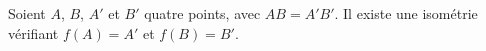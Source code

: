 Soient $A$, $B$, $A'$ et $B'$  quatre points, avec $AB=A'B'$. Il existe une isométrie vérifiant $f(A)=A'$ et $f(B)=B'$.

\begin{reponses}
\end{reponses}


